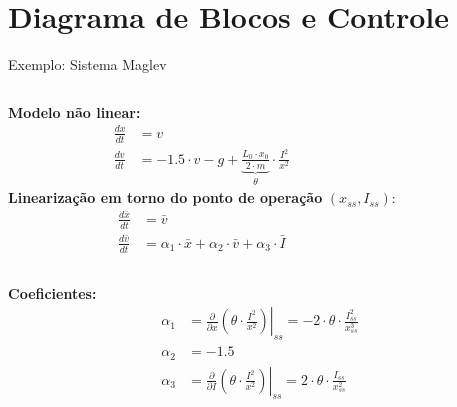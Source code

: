 \section{Diagrama de Blocos e Controle}

\begin{frame}{Exemplo: Sistema Maglev}
  \begin{columns}
    \textbf{Modelo não linear:}
    \begin{align*}
      \frac{dx}{dt} & = v                  \\
      \frac{dv}{dt} & = -1.5 \cdot v - g +
      \underbrace{\frac{L_0 \cdot x_0}{2 \cdot m}}_{\theta} \cdot \frac{I^2}{x^2}
    \end{align*}
    \textbf{Linearização em torno do ponto de operação} $(x_{ss}, I_{ss})$:
    \begin{align*}
      \frac{d\bar{x}}{dt} & = \bar{v}                                                                 \\
      \frac{d\bar{v}}{dt} & =\alpha_1 \cdot \bar{x} + \alpha_2 \cdot \bar{v} + \alpha_3 \cdot \bar{I}
    \end{align*}
  \end{columns}
  \textbf{Coeficientes:}
  \begin{align*}
    \alpha_1 & =
    \left.\frac{\partial}{\partial x} \left( \theta \cdot \frac{I^2}{x^2} \right)\right|_{ss}
    = -2 \cdot \theta \cdot \frac{I_{ss}^2}{x_{ss}^3} \\
    \alpha_2 & = -1.5                                 \\
    \alpha_3 & =
    \left.\frac{\partial}{\partial I} \left( \theta \cdot \frac{I^2}{x^2} \right)\right|_{ss}
    = 2 \cdot \theta \cdot \frac{I_{ss}}{x_{ss}^2}
  \end{align*}
\end{frame}

